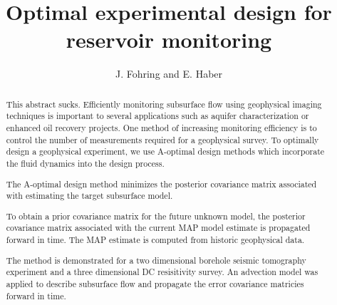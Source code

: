 \documentclass[12pt]{article}
\begin{document}
\title{Optimal experimental design for reservoir monitoring}
\author{J. Fohring and E. Haber }


\maketitle
\begin{abstract}
This abstract sucks. Efficiently monitoring subsurface flow using geophysical imaging techniques is important to several applications such as aquifer characterization or enhanced oil recovery projects.
One method of increasing monitoring efficiency is to control the number of measurements required for a geophysical survey. To optimally design a geophysical experiment, we use A-optimal design methods which incorporate the fluid dynamics into the design process. 

The A-optimal design method minimizes the posterior covariance matrix associated with estimating the target subsurface model. 

To obtain a prior covariance matrix for the future unknown model, the posterior covariance matrix associated with the current MAP model estimate is propagated forward in time. The MAP estimate is computed from historic geophysical data. 

The method is demonstrated for a two dimensional borehole seismic tomography experiment and a three dimensional DC resisitivity survey. An advection model  was applied to describe subsurface flow and  propagate the error covariance matricies forward in time. 
 


\end{abstract}
\end{document}
